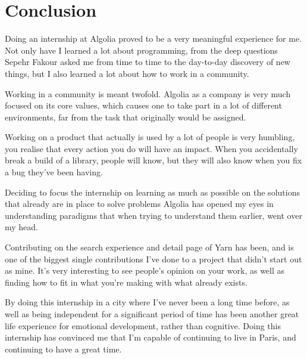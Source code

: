 
\chapter{Conclusion} %
\label{chp:conclusion}

Doing an internship at Algolia proved to be a very meaningful experience for me. Not only have I learned a lot about programming, from the deep questions Sepehr Fakour asked me from time to time to the day-to-day discovery of new things, but I also learned a lot about how to work in a community.

Working in a community is meant twofold. Algolia as a company is very much focused on its core values, which causes one to take part in a lot of different environments, far from the task that originally would be assigned.

Working on a product that actually is used by a lot of people is very humbling, you realise that every action you do will have an impact. When you accidentally break a build of a library, people will know, but they will also know when you fix a bug they've been having.

Deciding to focus the internship on learning as much as possible on the solutions that already are in place to solve problems Algolia has opened my eyes in understanding paradigms that when trying to understand them earlier, went over my head.

Contributing on the search experience and detail page of Yarn has been, and is one of the biggest single contributions I've done to a project that didn't start out as mine. It's very interesting to see people's opinion on your work, as well as finding how to fit in what you're making with what already exists.

By doing this internship in a city where I've never been a long time before, as well as being independent for a significant period of time has been another great life experience for emotional development, rather than cognitive. Doing this internship has convinced me that I'm capable of continuing to live in Paris, and continuing to have a great time.
